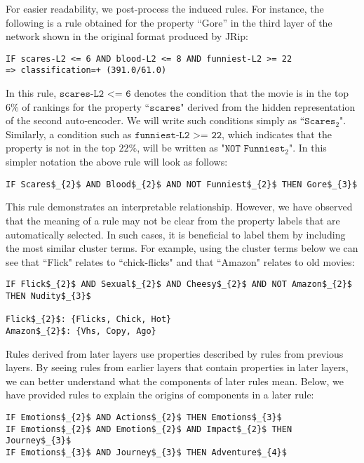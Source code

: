 For easier readability, we post-process the induced rules. For instance, the following is a rule obtained for the property ``Gore'' in the third layer of the network shown in the original format produced by JRip:

\begin{lstlisting}[mathescape=true]
IF scares-L2 <= 6 AND blood-L2 <= 8 AND funniest-L2 >= 22
=> classification=+ (391.0/61.0)
\end{lstlisting}

\noindent In this rule, $\texttt{scares-L2 <= 6}$ denotes the condition that the movie is in the top 6\% of rankings for the property ``$\texttt{scares}$" derived from the hidden representation of the second auto-encoder. We will write such conditions simply as ``$\texttt{Scares$_{2}$}$". Similarly, a condition such as $\texttt{funniest-L2 >= 22}$, which indicates that the property is not in the top $22\%$, will be written as "$\texttt{NOT Funniest}$$_{2}$". In this simpler notation the above rule will look as follows: %

\begin{lstlisting}[mathescape=true]
IF Scares$_{2}$ AND Blood$_{2}$ AND NOT Funniest$_{2}$ THEN Gore$_{3}$
\end{lstlisting}

This rule demonstrates an interpretable relationship. However, we have observed that the meaning of a rule may not be clear from the property labels that are automatically selected. In such cases, it is beneficial to label them by including the most similar cluster terms. For example, using the cluster terms below we can see that ``Flick" relates to ``chick-flicks" and that ``Amazon" relates to old movies:

\begin{lstlisting}[mathescape=true]
IF Flick$_{2}$ AND Sexual$_{2}$ AND Cheesy$_{2}$ AND NOT Amazon$_{2}$ THEN Nudity$_{3}$

Flick$_{2}$: {Flicks, Chick, Hot}
Amazon$_{2}$: {Vhs, Copy, Ago}
\end{lstlisting}

Rules derived from later layers use properties described by rules from previous layers. By seeing rules from earlier layers that contain properties in later layers, we can better understand what the components of later rules mean. Below, we have provided rules to explain the origins of components in a later rule:

\begin{lstlisting}[mathescape=true]
IF Emotions$_{2}$ AND Actions$_{2}$ THEN Emotions$_{3}$ 
IF Emotions$_{2}$ AND Emotion$_{2}$ AND Impact$_{2}$ THEN Journey$_{3}$ 
IF Emotions$_{3}$ AND Journey$_{3}$ THEN Adventure$_{4}$ 
\end{lstlisting}

